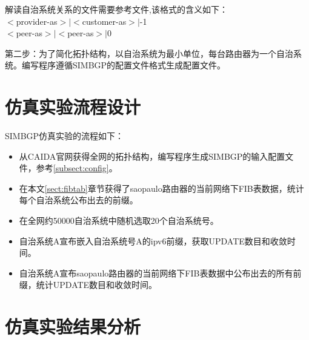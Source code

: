 解读自治系统关系的文件需要参考文件,该格式的含义如下：\\
$<$provider-as$>|<$customer-as$>|$-1\\
$<$peer-as$>|<$peer-as$>|$0

第二步：为了简化拓扑结构，以自治系统为最小单位，每台路由器为一个自治系统。编写程序遵循SIMBGP的配置文件格式生成配置文件。

\section{仿真实验流程设计}
SIMBGP仿真实验的流程如下：
\begin{itemize}
\item 从CAIDA官网获得全网的拓扑结构，编写程序生成SIMBGP的输入配置文件，参考\ref{subsect:config}。
\item 在本文\ref{sect:fibtab}章节获得了saopaulo路由器的当前网络下FIB表数据，统计每个自治系统公布出去的前缀。
\item 在全网约50000自治系统中随机选取20个自治系统号。
\item 自治系统A宣布嵌入自治系统号A的ipv6前缀，获取UPDATE数目和收敛时间。
\item 自治系统A宣布saopaulo路由器的当前网络下FIB表数据中公布出去的所有前缀，统计UPDATE数目和收敛时间。
\end{itemize}

\section{仿真实验结果分析}



